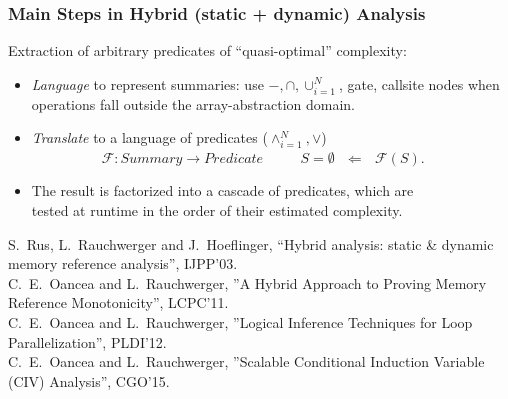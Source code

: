 \documentclass{beamer}
\renewcommand{\emph}[1]{\textcolor{structure}{#1}}
\begin{document}
\begin{frame}[fragile,t]
  \frametitle{Main Steps in Hybrid (static + dynamic) Analysis}

Extraction of arbitrary predicates of ``quasi-optimal'' complexity:
\begin{itemize}

    \item \emph{{\em Language}} to represent summaries: use $-, \cap, \cup_{i=1}^N$, gate, callsite
            nodes when operations fall outside the array-abstraction domain.\smallskip
    
    \item \emph{{\em Translate}} to a language of predicates ($\wedge_{i=1}^{N}, \vee$) \\
            $\mbox{ }\mbox{ }\mbox{ }\mbox{ }\mbox{ }\mbox{ }\mbox{ }$
                \emph{$\mathcal{F} : Summary \rightarrow Predicate$  $\mbox{ }\mbox{ }\mbox{ }$ 
                $S = \emptyset \mbox{ }\Leftarrow\mbox{ }\mathcal{F}(S)$}. \smallskip

    \item The result is factorized into a cascade of predicates, which are \\
            tested at runtime in the order of their estimated complexity. \smallskip

\end{itemize}


{\tiny S.~Rus, L.~Rauchwerger and J.~Hoeflinger, ``Hybrid analysis: static \& dynamic memory reference analysis'', IJPP'03.}\\\smallskip
{\tiny C.~E.~Oancea and L.~Rauchwerger, ''A Hybrid Approach to Proving Memory Reference Monotonicity'', LCPC'11.}\\\smallskip
{\tiny C.~E.~Oancea and L.~Rauchwerger, ''Logical Inference Techniques for Loop Parallelization'', PLDI'12.}\\\smallskip
{\tiny C.~E.~Oancea and L.~Rauchwerger, ''Scalable Conditional Induction Variable (CIV) Analysis'', CGO'15.}\\\smallskip

\end{frame}
\end{document}
